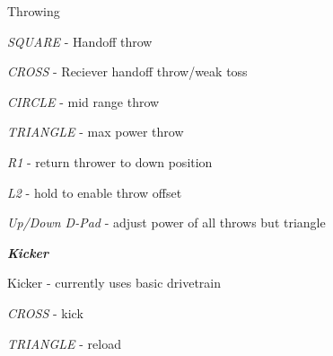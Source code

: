 \begin{DoxyItemize}
{\begin{DoxyItemize}
\item Throwing
\begin{DoxyItemize}
\item {\itshape S\+Q\+U\+A\+RE} -\/ Handoff throw
\item {\itshape C\+R\+O\+SS} -\/ Reciever handoff throw/weak toss
\item {\itshape C\+I\+R\+C\+LE} -\/ mid range throw
\item {\itshape T\+R\+I\+A\+N\+G\+LE} -\/ max power throw
\item {\itshape R1} -\/ return thrower to down position
\item {\itshape L2} -\/ hold to enable throw offset
\begin{DoxyItemize}
\item {\itshape Up/\+Down D-\/\+Pad} -\/ adjust power of all throws but triangle
\end{DoxyItemize}
\end{DoxyItemize}
\end{DoxyItemize}}
\item {\itshape {\bfseries Kicker}
\begin{DoxyItemize}
\item Kicker -\/ currently uses basic drivetrain
\item {\itshape C\+R\+O\+SS} -\/ kick
\item {\itshape T\+R\+I\+A\+N\+G\+LE} -\/ reload 
\end{DoxyItemize}}
\end{DoxyItemize}